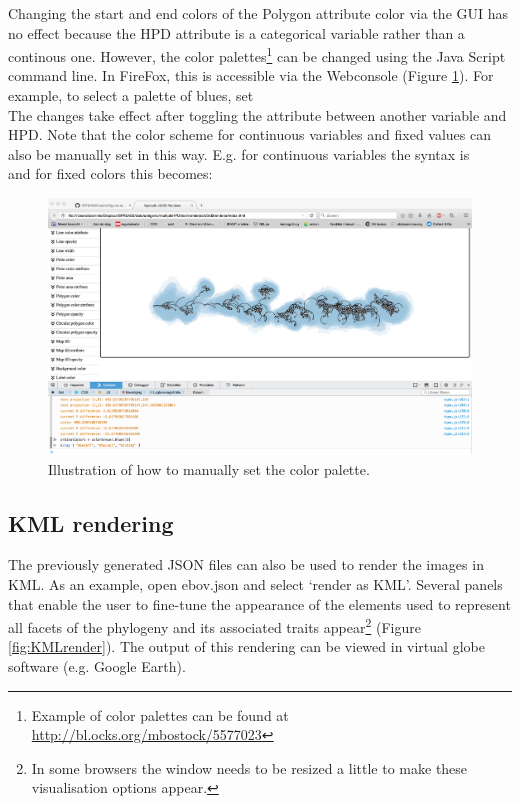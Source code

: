 \documentclass[english]{paper}
\begin{document}
Changing the start and end colors of the Polygon attribute color via the GUI has no effect because the HPD attribute is a categorical variable rather than a continous one. 
However, the color palettes\footnote{Example of color palettes can be found at \url{http://bl.ocks.org/mbostock/5577023}} can be changed using the Java Script command line.
In FireFox, this is accessible via the Webconsole (Figure \ref{fig:overridePalette}).
For example, to select a palette of blues, set 
\\
The changes take effect after toggling the attribute between another variable and HPD.
Note that the color scheme for continuous variables and fixed values can also be manually set in this way.
E.g. for continuous variables the syntax is 
\\
and for fixed colors this becomes:
\\

\begin{figure}%
\centering
\includegraphics[width=1\textwidth]{./figures/manualOverride_palette.pdf} 
\caption{Illustration of how to manually set the color palette.}
\label{fig:overridePalette}
\end{figure}


\subsection{KML rendering}
\label{kmlRender}

The previously generated JSON files can also be used to render the images in KML. 
As an example, open ebov.json and select `render as KML'.
Several panels that enable the user to fine-tune the appearance of the elements used to represent all facets of the phylogeny and its associated traits appear\footnote{In some browsers the window needs to be resized a little to make these visualisation options appear.} (Figure \ref{fig:KMLrender}).
The output of this rendering can be viewed in virtual globe software (e.g. Google Earth).
\end{document}
